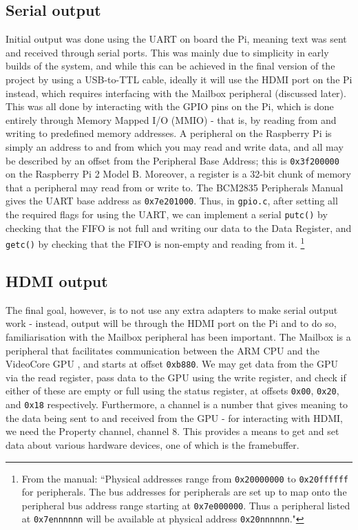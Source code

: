 \documentclass[10pt,a4paper]{article}
\newcommand{\code}[1]{\texttt{#1}}
\begin{document}
\subsection{Serial output}
Initial output was done using the UART on board the Pi, meaning text was sent
and received through serial ports. This was mainly due to simplicity in early
builds of the system, and while this can be achieved in the final version of the
project by using a USB-to-TTL cable, ideally it will use the HDMI port on the Pi
instead, which requires interfacing with the Mailbox peripheral (discussed
later). This was all done by interacting with the GPIO pins on the Pi, which is
done entirely through Memory Mapped I/O (MMIO) - that is, by reading from and
writing to predefined memory addresses. A peripheral on the Raspberry Pi is
simply an address to and from which you may read and write data, and all may be
described by an offset from the Peripheral Base Address; this is
\code{0x3f200000} on the Raspberry Pi 2 Model B. Moreover, a register is a
32-bit chunk of memory that a peripheral may read from or write to. The BCM2835
Peripherals Manual gives the UART base address as \code{0x7e201000}. Thus, in
\code{gpio.c}, after setting all the required flags for using the UART, we can
implement a serial \code{putc()} by checking that the FIFO is not full and
writing our data to the Data Register, and \code{getc()} by checking that the
FIFO is non-empty and reading from it. \footnote{From the manual: ``Physical
addresses range from \code{0x20000000} to \code{0x20ffffff} for peripherals. The
bus addresses for peripherals are set up to map onto the peripheral bus address
range starting at \code{0x7e000000}. Thus a peripheral listed at
\code{0x7ennnnnn} will be available at physical address \code{0x20nnnnnn}."}

\subsection{HDMI output}
The final goal, however, is to not use any extra adapters to make serial output
work - instead, output will be through the HDMI port on the Pi and to do so,
familiarisation with the Mailbox peripheral has been important. The Mailbox is a
peripheral that facilitates communication between the ARM CPU and the VideoCore
GPU \cite{Mailboxes}, and starts at offset \code{0xb880}. We may get data from the GPU via the
read register, pass data to the GPU using the write register, and check if
either of these are empty or full using the status register, at offsets
\code{0x00}, \code{0x20}, and \code{0x18} respectively. Furthermore, a channel
is a number that gives meaning to the data being sent to and received from the
GPU - for interacting with HDMI, we need the Property channel, channel 8. This
provides a means to get and set data about various hardware devices, one of
which is the framebuffer.
\end{document}
